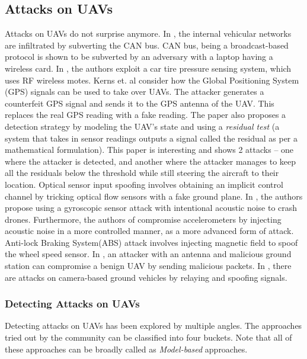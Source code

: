 \subsection{Attacks on UAVs} Attacks on UAVs do not surprise anymore. In \cite{checkoway2011comprehensive, koscher2010experimental}, the internal vehicular networks are infiltrated by subverting the CAN bus. CAN bus, being a broadcast-based protocol is shown to be subverted by an adversary with a laptop having a wireless card. In \cite{ishtiaq2010security}, the authors exploit a car tire pressure sensing system, which uses RF wireless motes. Kerns et. al \cite{kerns2014unmanned} consider how the Global Positioning System (GPS) signals can be used to take over UAVs. The attacker generates a counterfeit GPS signal and sends it to the GPS antenna of the UAV. This replaces the real GPS reading with a fake reading. The paper also proposes a detection strategy by modeling the UAV's state and using a \textit{residual test} (a system that takes in sensor readings outputs a signal called the residual as per a mathematical formulation). This paper is interesting and shows 2 attacks -- one where the attacker is detected, and another where the attacker manages to keep all the residuals below the threshold while still steering the aircraft to their location. Optical sensor input spoofing \cite{davidson2016controlling} involves obtaining an implicit control channel by tricking optical flow sensors with a fake ground plane. In \cite{son2015rocking}, the authors propose using a gyroscopic sensor attack with intentional acoustic noise to crash drones. Furthermore, the authors of \cite{trippel2017walnut} compromise accelerometers by injecting acoustic noise in a more controlled manner, as a more advanced form of attack. Anti-lock Braking System(ABS) attack \cite{shoukry2013non} involves injecting magnetic field to spoof the wheel speed sensor. In \cite{highnam2016uncrewed}, an attacker with an antenna and malicious ground station can compromise a benign UAV by sending malicious packets. In \cite{petit2015remote}, there are attacks on camera-based ground vehicles by relaying and spoofing signals.


\subsubsection{Detecting Attacks on UAVs} Detecting attacks on UAVs has been explored by multiple angles. The approaches tried out by the community can be classified into four buckets. Note that all of these approaches can be broadly called as \textit{Model-based} approaches.

